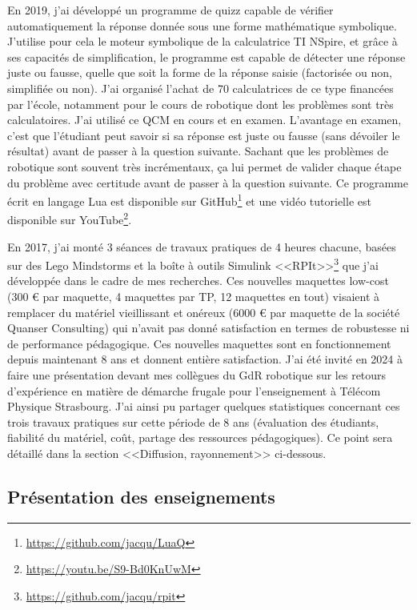 \documentclass[a4paper,12pt]{article}
\begin{document}
En 2019, j'ai développé un programme de quizz capable de vérifier automatiquement la réponse donnée sous une forme mathématique symbolique. J'utilise pour cela le moteur symbolique de la calculatrice TI NSpire, et grâce à ses capacités de simplification, le programme est capable de détecter une réponse juste ou fausse, quelle que soit la forme de la réponse saisie (factorisée ou non, simplifiée ou non). J'ai organisé l'achat de 70 calculatrices de ce type financées par l'école, notamment pour le cours de robotique dont les problèmes sont très calculatoires. J'ai utilisé ce QCM en cours et en examen. L'avantage en examen, c'est que l'étudiant peut savoir si sa réponse est juste ou fausse (sans dévoiler le résultat) avant de passer à la question suivante. Sachant que les problèmes de robotique sont souvent très incrémentaux, ça lui permet de valider chaque étape du problème avec certitude avant de passer à la question suivante. Ce programme écrit en langage Lua est disponible sur GitHub\footnote{\url{https://github.com/jacqu/LuaQ}} et une vidéo tutorielle est disponible sur YouTube\footnote{\url{https://youtu.be/S9-Bd0KnUwM}}.

En 2017, j'ai monté 3 séances de travaux pratiques de 4 heures chacune, basées sur des Lego Mindstorms et la boîte à outils Simulink <<RPIt>>\footnote{\url{https://github.com/jacqu/rpit}} que j'ai développée dans le cadre de mes recherches. Ces nouvelles maquettes low-cost (300 € par maquette, 4 maquettes par TP, 12 maquettes en tout) visaient à remplacer du matériel vieillissant et onéreux (6000 € par maquette de la société Quanser Consulting) qui n'avait pas donné satisfaction en termes de robustesse ni de performance pédagogique. Ces nouvelles maquettes sont en fonctionnement depuis maintenant 8 ans et donnent entière satisfaction. J'ai été invité en 2024 à faire une présentation devant mes collègues du GdR robotique sur les retours d'expérience en matière de démarche frugale pour l'enseignement à Télécom Physique Strasbourg. J'ai ainsi pu partager quelques statistiques concernant ces trois travaux pratiques sur cette période de 8 ans (évaluation des étudiants, fiabilité du matériel, coût, partage des ressources pédagogiques). Ce point sera détaillé dans la section <<Diffusion, rayonnement>> ci-dessous.

\subsection{Présentation des enseignements}
\end{document}
